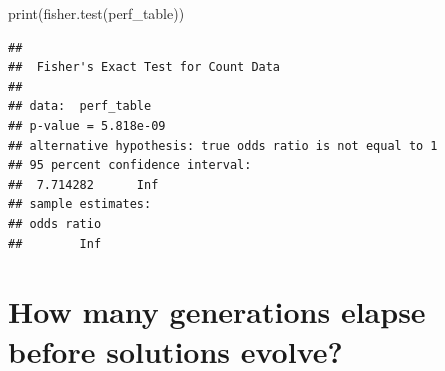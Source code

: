\documentclass[
]{book}
\newenvironment{Shaded}{\begin{snugshade}}{\end{snugshade}}
\newcommand{\FunctionTok}[1]{\textcolor[rgb]{0.00,0.00,0.00}{#1}}
\newcommand{\NormalTok}[1]{#1}
\begin{document}
\begin{Shaded}
\begin{Highlighting}[]
\FunctionTok{print}\NormalTok{(}\FunctionTok{fisher.test}\NormalTok{(perf\_table))}
\end{Highlighting}
\end{Shaded}

\begin{verbatim}
## 
##  Fisher's Exact Test for Count Data
## 
## data:  perf_table
## p-value = 5.818e-09
## alternative hypothesis: true odds ratio is not equal to 1
## 95 percent confidence interval:
##  7.714282      Inf
## sample estimates:
## odds ratio 
##        Inf
\end{verbatim}

\hypertarget{how-many-generations-elapse-before-solutions-evolve-1}{%
\section{How many generations elapse before solutions evolve?}\label{how-many-generations-elapse-before-solutions-evolve-1}}
\end{document}
